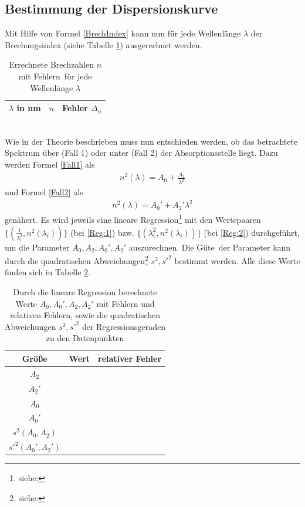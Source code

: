 \subsection{Bestimmung der Dispersionskurve}
Mit Hilfe von Formel \eqref{BrechIndex} kann nun für jede Wellenlänge $\lambda$ der Brechungsindex (siehe Tabelle \ref{tab:Brechzahl}) ausgerechnet werden.
\begin{table}[h!]
	\centering	
	\begin{tabular}{c|c|c}
		$\lambda$ in \si{\nano\meter} & $n$ & Fehler $\Delta_n$ \\
		\hline
		
	\end{tabular}
	\caption[Errechnete Brechzahlen $n$ mit Fehlern für jede Wellenlänge $\lambda$]{Errechnete Brechzahlen $n$ mit Fehlern\footnotemark\ für jede Wellenlänge $\lambda$}
	\label{tab:Brechzahl}
\end{table}
 \\
Wie in der Theorie beschrieben muss nun entschieden werden, ob das betrachtete Spektrum über (Fall 1) oder unter (Fall 2) der Absorptionsstelle liegt. Dazu werden Formel \eqref{Fall1} als
\begin{align}\label{Reg:1}
	n^2(\lambda) = A_0 + \frac{A_2}{\lambda^2}
\end{align}
und Formel \eqref{Fall2} als
\begin{align}\label{Reg:2}
	n^2(\lambda) = A_0' + A_2'\lambda^2
\end{align}
genähert. Es wird jeweils eine lineare Regression\footnote{siehe: } mit den Wertepaaren $\{ (\frac{1}{\lambda_i^2}, n^2(\lambda_i)) \}$ (bei \eqref{Reg:1}) bzw. $\{ (\lambda_i^2, n^2(\lambda_i)) \}$ (bei \eqref{Reg:2}) durchgeführt, um die Parameter $A_0, A_2, A_0', A_2'$ auszurechnen. Die \glqq Güte\grqq\ der Parameter kann durch die quadratischen Abweichungen\footnote{siehe: } $s^2, s'^2$ bestimmt werden. Alle diese Werte finden sich in Tabelle \ref{tab:Regression}.
\begin{table}[h!]
	\centering
	\begin{tabular}{c|c|c}
		Größe & Wert & relativer Fehler \\
		\hline
		$A_2$ &  &  \\
		$A_2'$ &  &  \\
		$A_0$ &  &  \\
		$A_0'$ &  &  \\
		\hline
		$s^2(A_0,A_2)$ &  & \\
		$s'^2(A_0',A_2')$ &  &
	\end{tabular}
	\caption{Durch die lineare Regression berechnete Werte $A_0,A_0',A_2,A_2'$ mit Fehlern und relativen Fehlern, sowie die quadratischen Abweichungen $s^2,s'^2$ der Regressionsgeraden zu den Datenpunkten}
	\label{tab:Regression}
\end{table}
